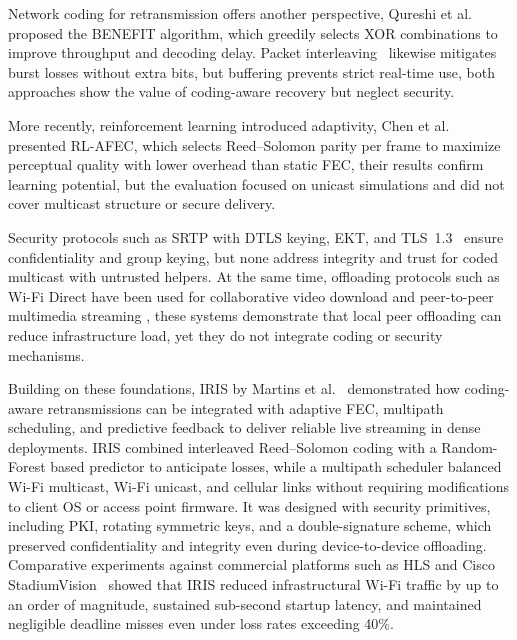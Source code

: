 
\quad Network coding for retransmission offers another perspective, Qureshi et al.~\cite{qureshi2011benefit} proposed the BENEFIT algorithm, which greedily selects XOR combinations to improve throughput and decoding delay. Packet interleaving~\cite{adalier2009interleaving} likewise mitigates burst losses without extra bits, but buffering prevents strict real-time use, both approaches show the value of coding-aware recovery but neglect security.

\quad More recently, reinforcement learning introduced adaptivity, Chen et al.~\cite{chen2018rlafec} presented RL-AFEC, which selects Reed–Solomon parity per frame to maximize perceptual quality with lower overhead than static FEC, their results confirm learning potential, but the evaluation focused on unicast simulations and did not cover multicast structure or secure delivery.

\quad Security protocols such as SRTP with DTLS keying, EKT, and TLS~1.3~\cite{baugher2004srtp,wing2004ekt,rescorla2018tls13} ensure confidentiality and group keying, but none address integrity and trust for coded multicast with untrusted helpers. At the same time, offloading protocols such as Wi-Fi Direct have been used for collaborative video download and peer-to-peer multimedia streaming \cite{sha2016wifidirect,poderys2017overlay,androidWFD}, these systems demonstrate that local peer offloading can reduce infrastructure load, yet they do not integrate coding or security mechanisms.

\quad Building on these foundations, IRIS by Martins et al.~\cite{martins2018iris} demonstrated how coding-aware retransmissions can be integrated with adaptive FEC, multipath scheduling, and predictive feedback to deliver reliable live streaming in dense deployments. IRIS combined interleaved Reed–Solomon coding with a Random-Forest based predictor to anticipate losses, while a multipath scheduler balanced Wi-Fi multicast, Wi-Fi unicast, and cellular links without requiring modifications to client OS or access point firmware. It was designed with security primitives, including PKI, rotating symmetric keys, and a double-signature scheme, which preserved confidentiality and integrity even during device-to-device offloading. Comparative experiments against commercial platforms such as HLS \cite{pantos2017hls} and Cisco StadiumVision~\cite{ciscoStadiumVision} showed that IRIS reduced infrastructural Wi-Fi traffic by up to an order of magnitude, sustained sub-second startup latency, and maintained negligible deadline misses even under loss rates exceeding 40\%.

